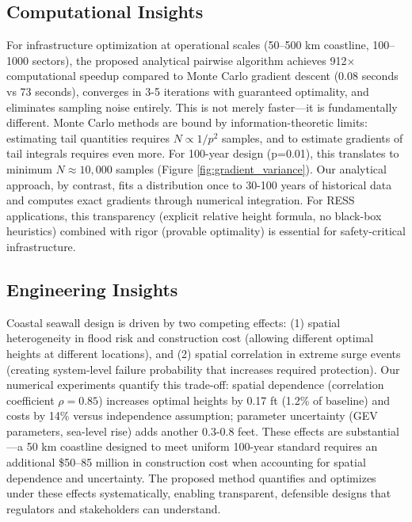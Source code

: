 \documentclass[review]{elsarticle}
\begin{document}
\subsection*{Computational Insights}

For infrastructure optimization at operational scales (50--500 km coastline, 100--1000 sectors), the proposed analytical pairwise algorithm achieves 912× computational speedup compared to Monte Carlo gradient descent (0.08 seconds vs 73 seconds), converges in 3-5 iterations with guaranteed optimality, and eliminates sampling noise entirely. This is not merely faster—it is fundamentally different. Monte Carlo methods are bound by information-theoretic limits: estimating tail quantities requires $N \propto 1/p^2$ samples, and to estimate gradients of tail integrals requires even more. For 100-year design (p=0.01), this translates to minimum $N \approx 10,000$ samples (Figure \ref{fig:gradient_variance}). Our analytical approach, by contrast, fits a distribution once to 30-100 years of historical data and computes exact gradients through numerical integration. For RESS applications, this transparency (explicit relative height formula, no black-box heuristics) combined with rigor (provable optimality) is essential for safety-critical infrastructure.

\subsection*{Engineering Insights}

Coastal seawall design is driven by two competing effects: (1) spatial heterogeneity in flood risk and construction cost (allowing different optimal heights at different locations), and (2) spatial correlation in extreme surge events (creating system-level failure probability that increases required protection). Our numerical experiments quantify this trade-off: spatial dependence (correlation coefficient $\rho = 0.85$) increases optimal heights by 0.17 ft (1.2\% of baseline) and costs by 14\% versus independence assumption; parameter uncertainty (GEV parameters, sea-level rise) adds another 0.3-0.8 feet. These effects are substantial—a 50 km coastline designed to meet uniform 100-year standard requires an additional \$50--85 million in construction cost when accounting for spatial dependence and uncertainty. The proposed method quantifies and optimizes under these effects systematically, enabling transparent, defensible designs that regulators and stakeholders can understand.
\end{document}
